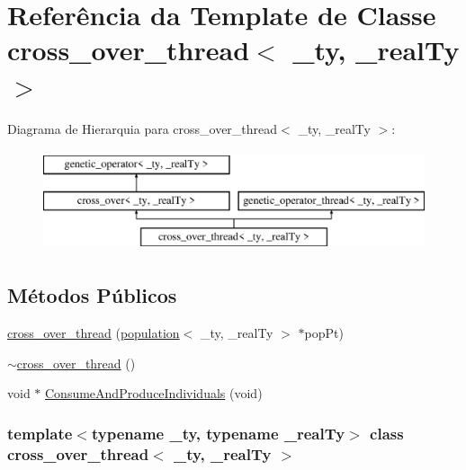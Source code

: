 \hypertarget{classcross__over__thread}{
\section{Referência da Template de Classe cross\_\-over\_\-thread$<$ \_\-ty, \_\-realTy $>$}
\label{classcross__over__thread}
}
Diagrama de Hierarquia para cross\_\-over\_\-thread$<$ \_\-ty, \_\-realTy $>$:\begin{figure}[H]
\begin{center}
\leavevmode
\includegraphics[height=3cm]{classcross__over__thread}
\end{center}
\end{figure}
\subsection*{Métodos Públicos}
\begin{DoxyCompactItemize}
\item 
\hyperlink{classcross__over__thread_acaa709237e2789b033adb64a7217059b}{cross\_\-over\_\-thread} (\hyperlink{classpopulation}{population}$<$ \_\-ty, \_\-realTy $>$ $\ast$popPt)
\item 
\hyperlink{classcross__over__thread_ac0399322791eac4c1e09d1f60653c610}{$\sim$cross\_\-over\_\-thread} ()
\item 
void $\ast$ \hyperlink{classcross__over__thread_a7cc2e9564ebe457e7e7c25d107b5da78}{ConsumeAndProduceIndividuals} (void)
\end{DoxyCompactItemize}
\subsubsection*{template$<$typename \_\-ty, typename \_\-realTy$>$ class cross\_\-over\_\-thread$<$ \_\-ty, \_\-realTy $>$}



